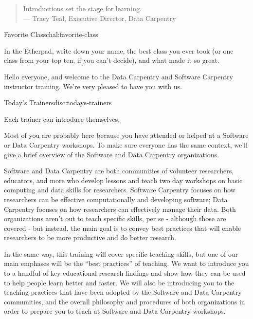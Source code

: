 
\begin{quote}
Introductions set the stage for learning.
\\
--- Tracy Teal, Executive Director, Data Carpentry
\end{quote}

\begin{challenge}{Favorite Class}{chal:favorite-class}

In the Etherpad, write down your name, the best class you ever took (or
one class from your top ten, if you can't decide), and what made it so
great.

\end{challenge}

Hello everyone, and welcome to the Data Carpentry and Software Carpentry
instructor training. We're very pleased to have you with us.

\begin{discussion}{Today's Trainers}{disc:todays-trainers}

Each trainer can introduce themselves.

\end{discussion}

Most of you are probably here because you have attended or helped at a
Software or Data Carpentry workshops. To make sure everyone has the same
context, we'll give a brief overview of the Software and Data Carpentry
organizations.

Software and Data Carpentry are both communities of volunteer
researchers, educators, and more who develop lessons and teach two day
workshops on basic computing and data skills for researchers. Software
Carpentry focuses on how researchers can be effective computationally
and developing software; Data Carpentry focuses on how researchers can
effectively manage their data. Both organizations aren't out to teach
specific skills, per se - although those are covered - but instead, the
main goal is to convey best practices that will enable researchers to be
more productive and do better research.

In the same way, this training will cover specific teaching skills, but
one of our main emphases will be the ``best practices'' of teaching. We
want to introduce you to a handful of key educational research findings
and show how they can be used to help people learn better and faster. We
will also be introducing you to the teaching practices that have been
adopted by the Software and Data Carpentry communities, and the overall
philosophy and procedures of both organizations in order to prepare you
to teach at Software and Data Carpentry workshops.

